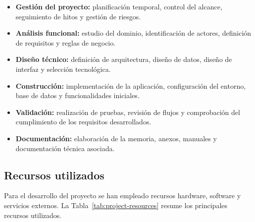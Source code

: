 \begin{itemize}
    \item \textbf{Gestión del proyecto:} planificación temporal, control del alcance, seguimiento de hitos y gestión de riesgos.
    \item \textbf{Análisis funcional:} estudio del dominio, identificación de actores, definición de requisitos y reglas de negocio.
    \item \textbf{Diseño técnico:} definición de arquitectura, diseño de datos, diseño de interfaz y selección tecnológica.
    \item \textbf{Construcción:} implementación de la aplicación, configuración del entorno, base de datos y funcionalidades iniciales.
    \item \textbf{Validación:} realización de pruebas, revisión de flujos y comprobación del cumplimiento de los requisitos desarrollados.
    \item \textbf{Documentación:} elaboración de la memoria, anexos, manuales y documentación técnica asociada.
\end{itemize}

\subsection{Recursos utilizados}

Para el desarrollo del proyecto se han empleado recursos hardware, software y servicios externos. La Tabla~\ref{tab:project-resources} resume los principales recursos utilizados.

